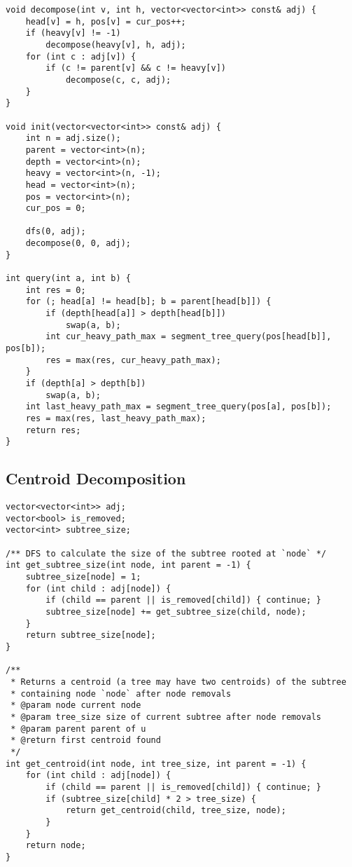 \documentclass[10pt]{article}
\begin{document}
\begin{multicols*}{2}
\begin{lstlisting}[style=compactcpp]
void decompose(int v, int h, vector<vector<int>> const& adj) {
    head[v] = h, pos[v] = cur_pos++;
    if (heavy[v] != -1)
        decompose(heavy[v], h, adj);
    for (int c : adj[v]) {
        if (c != parent[v] && c != heavy[v])
            decompose(c, c, adj);
    }
}

void init(vector<vector<int>> const& adj) {
    int n = adj.size();
    parent = vector<int>(n);
    depth = vector<int>(n);
    heavy = vector<int>(n, -1);
    head = vector<int>(n);
    pos = vector<int>(n);
    cur_pos = 0;

    dfs(0, adj);
    decompose(0, 0, adj);
}

int query(int a, int b) {
    int res = 0;
    for (; head[a] != head[b]; b = parent[head[b]]) {
        if (depth[head[a]] > depth[head[b]])
            swap(a, b);
        int cur_heavy_path_max = segment_tree_query(pos[head[b]], pos[b]);
        res = max(res, cur_heavy_path_max);
    }
    if (depth[a] > depth[b])
        swap(a, b);
    int last_heavy_path_max = segment_tree_query(pos[a], pos[b]);
    res = max(res, last_heavy_path_max);
    return res;
}
\end{lstlisting}

\subsection{Centroid Decomposition}

\begin{lstlisting}[style=compactcpp]
	vector<vector<int>> adj;
vector<bool> is_removed;
vector<int> subtree_size;

/** DFS to calculate the size of the subtree rooted at `node` */
int get_subtree_size(int node, int parent = -1) {
	subtree_size[node] = 1;
	for (int child : adj[node]) {
		if (child == parent || is_removed[child]) { continue; }
		subtree_size[node] += get_subtree_size(child, node);
	}
	return subtree_size[node];
}

/**
 * Returns a centroid (a tree may have two centroids) of the subtree
 * containing node `node` after node removals
 * @param node current node
 * @param tree_size size of current subtree after node removals
 * @param parent parent of u
 * @return first centroid found
 */
int get_centroid(int node, int tree_size, int parent = -1) {
	for (int child : adj[node]) {
		if (child == parent || is_removed[child]) { continue; }
		if (subtree_size[child] * 2 > tree_size) {
			return get_centroid(child, tree_size, node);
		}
	}
	return node;
}


\end{lstlisting}
\end{multicols*}
\end{document}
